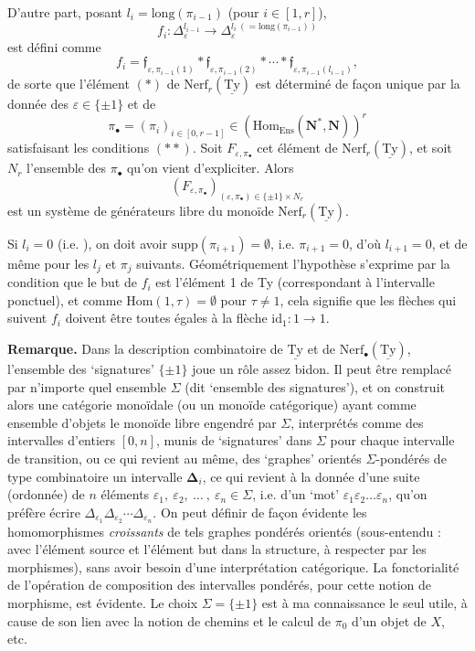 \documentclass[11pt]{article}
\newcommand{\printedpage}[1]{\marginpar{\footnotesize p.~#1}}
\newcommand{\msp}[1]{\marginpar{\footnotesize [#1]}}
\newcommand{\Ty}{\underline{\mathrm{Ty}}}
\newcommand{\Nerf}{\mathrm{Nerf}}
\begin{document}
\printedpage{39}
D'autre part, posant $l_i = \mathrm{long}(\pi_{i-1})$ (pour $i \in [1,r]$),
\[
f_i : \Delta_\varepsilon^{l_{i-1}} \longrightarrow \Delta_\varepsilon^{l_i\ (=\mathrm{long}(\pi_{i-1}))}
\]
est défini comme
\[
f_i = \mathfrak{f}_{\varepsilon,\pi_{i-1}(1)} * \mathfrak{f}_{\varepsilon,\pi_{i-1}(2)} * \cdots * \mathfrak{f}_{\varepsilon,\pi_{i-1}(l_{i-1})},
\]
de sorte que l'élément $(*)$ de $\Nerf_r(\Ty)$ est déterminé de façon unique par la donnée des $\varepsilon \in \{\pm 1\}$ et de
\[
\pi_\bullet = (\pi_i)_{i\in[0,r-1]} \in (\mathrm{Hom}_{\mathrm{Ens}}(\mathbf{N}^*,\mathbf{N}))^r
\]
satisfaisant les conditions $(**)$. Soit $F_{\varepsilon,\pi_\bullet}$ cet élément de $\Nerf_r(\Ty)$, et soit $N_r$ l'ensemble des $\pi_\bullet$ qu'on vient d'expliciter. Alors
\[
(F_{\varepsilon,\pi_\bullet})_{(\varepsilon,\pi_\bullet)\in\{\pm1\}\times N_r}
\]
est un système de générateurs libre du monoïde $\Nerf_r(\Ty)$.

Si $l_i = 0$ (i.e. ), on doit avoir $\mathrm{supp}(\pi_{i+1}) = \emptyset$, i.e. $\pi_{i+1} = 0$, d'où $l_{i+1} = 0$, et de même pour les $l_j$ et $\pi_j$ suivants. Géométriquement l'hypothèse s'exprime par la condition que le but
\msp{page 58}
de $f_i$ est l'élément 1 de Ty (correspondant à l'intervalle ponctuel), et comme $\mathrm{Hom}(1,\tau) = \emptyset$ pour $\tau \neq 1$, cela signifie que les flèches qui suivent $f_i$ doivent être toutes égales à la flèche $\mathrm{id}_1 : 1 \longrightarrow 1$.

\textbf{Remarque.} Dans la description combinatoire de $\Ty$ et de $\Nerf_\bullet(\Ty)$, l'ensemble des `signatures' $\{\pm1\}$ joue un rôle assez bidon. Il peut être remplacé par n'importe quel ensemble $\Sigma$ (dit `ensemble des signatures'), et on construit alors une catégorie monoïdale (ou un monoïde catégorique) ayant comme ensemble d'objets le monoïde libre engendré par $\Sigma$, interprétés comme des intervalles d'entiers $[0,n]$, munis de `signatures' dans $\Sigma$ pour chaque intervalle de transition, ou ce qui revient au même, des `graphes' orientés $\Sigma$-pondérés de type combinatoire un intervalle $\boldsymbol{\Delta}_i$, ce qui revient à la donnée d'une suite (ordonnée) de $n$ éléments $\varepsilon_1,\ \varepsilon_2,\ \ldots\ ,\ \varepsilon_n \in \Sigma$, i.e. d'un `mot' $\varepsilon_1\varepsilon_2\ldots\varepsilon_n$, qu'on préfère écrire $\Delta_{\varepsilon_1}\Delta_{\varepsilon_2}\cdots\Delta_{\varepsilon_n}$. On peut définir de façon évidente les homomorphismes \textit{croissants} de tels graphes pondérés orientés (sous-entendu : avec l'élément source et l'élément but dans la structure, à respecter par les morphismes), sans avoir besoin d'une interprétation catégorique. La fonctorialité de l'opération de composition des intervalles pondérés, pour cette notion de morphisme, est évidente. Le
\msp{page 59}
choix $\Sigma = \{\pm1\}$ est à ma connaissance le seul utile, à cause de son lien avec la notion de chemins et le calcul de $\pi_0$ d'un objet de $X$, etc.
\end{document}
